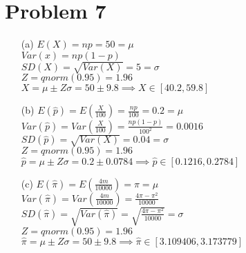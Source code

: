 \documentclass{article}
\begin{document}
\section*{Problem 7}
\begin{itemize}
	\item [(a)] $E(X)=np=50=\mu$\\$Var(x)=np(1-p)$\\$SD(X)=\sqrt{Var(X)}=5=\sigma$\\$Z=qnorm(0.95)=1.96$\\$X=\mu\pm Z\sigma=50\pm 9.8 \implies \boxed{X\in[40.2,59.8]}$
	\item [(b)] $E(\hat{p})=E(\frac{X}{100})=\frac{np}{100}=0.2=\mu$\\$Var(\hat{p})=Var(\frac{X}{100})=\frac{np(1-p)}{100^2}=0.0016$\\$SD(\hat{p})=\sqrt{Var(X)}=0.04=\sigma$\\$Z=qnorm(0.95)=1.96$\\$\hat{p}=\mu\pm Z\sigma=0.2\pm 0.0784\implies\boxed{\hat{p}\in[0.1216,0.2784]}$
	\item [(c)] $E(\hat{\pi})=E(\frac{4m}{10000})=\pi=\mu$\\$Var(\hat{\pi})=Var(\frac{4m}{10000})=\frac{4\pi-\pi^2}{10000}$\\$SD(\hat{\pi})=\sqrt{Var(\hat{\pi})}=\sqrt{\frac{4\pi-\pi^2}{10000}}=\sigma$\\$Z=qnorm(0.95)=1.96$\\$\hat{\pi}=\mu\pm Z\sigma=50\pm 9.8 \implies \boxed{\hat{\pi}\in[3.109406,3.173779]}$
\end{itemize}
\end{document}
